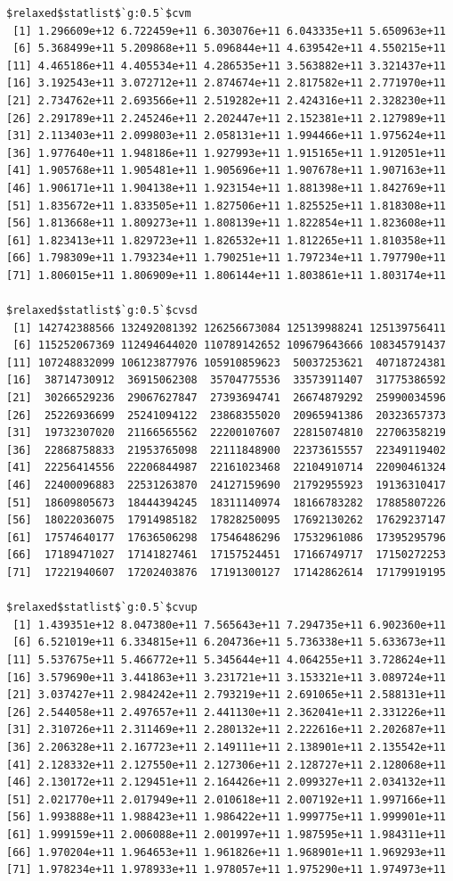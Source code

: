 \documentclass[
]{article}
\begin{document}
\begin{verbatim}
$relaxed$statlist$`g:0.5`$cvm
 [1] 1.296609e+12 6.722459e+11 6.303076e+11 6.043335e+11 5.650963e+11
 [6] 5.368499e+11 5.209868e+11 5.096844e+11 4.639542e+11 4.550215e+11
[11] 4.465186e+11 4.405534e+11 4.286535e+11 3.563882e+11 3.321437e+11
[16] 3.192543e+11 3.072712e+11 2.874674e+11 2.817582e+11 2.771970e+11
[21] 2.734762e+11 2.693566e+11 2.519282e+11 2.424316e+11 2.328230e+11
[26] 2.291789e+11 2.245246e+11 2.202447e+11 2.152381e+11 2.127989e+11
[31] 2.113403e+11 2.099803e+11 2.058131e+11 1.994466e+11 1.975624e+11
[36] 1.977640e+11 1.948186e+11 1.927993e+11 1.915165e+11 1.912051e+11
[41] 1.905768e+11 1.905481e+11 1.905696e+11 1.907678e+11 1.907163e+11
[46] 1.906171e+11 1.904138e+11 1.923154e+11 1.881398e+11 1.842769e+11
[51] 1.835672e+11 1.833505e+11 1.827506e+11 1.825525e+11 1.818308e+11
[56] 1.813668e+11 1.809273e+11 1.808139e+11 1.822854e+11 1.823608e+11
[61] 1.823413e+11 1.829723e+11 1.826532e+11 1.812265e+11 1.810358e+11
[66] 1.798309e+11 1.793234e+11 1.790251e+11 1.797234e+11 1.797790e+11
[71] 1.806015e+11 1.806909e+11 1.806144e+11 1.803861e+11 1.803174e+11

$relaxed$statlist$`g:0.5`$cvsd
 [1] 142742388566 132492081392 126256673084 125139988241 125139756411
 [6] 115252067369 112494644020 110789142652 109679643666 108345791437
[11] 107248832099 106123877976 105910859623  50037253621  40718724381
[16]  38714730912  36915062308  35704775536  33573911407  31775386592
[21]  30266529236  29067627847  27393694741  26674879292  25990034596
[26]  25226936699  25241094122  23868355020  20965941386  20323657373
[31]  19732307020  21166565562  22200107607  22815074810  22706358219
[36]  22868758833  21953765098  22111848900  22373615557  22349119402
[41]  22256414556  22206844987  22161023468  22104910714  22090461324
[46]  22400096883  22531263870  24127159690  21792955923  19136310417
[51]  18609805673  18444394245  18311140974  18166783282  17885807226
[56]  18022036075  17914985182  17828250095  17692130262  17629237147
[61]  17574640177  17636506298  17546486296  17532961086  17395295796
[66]  17189471027  17141827461  17157524451  17166749717  17150272253
[71]  17221940607  17202403876  17191300127  17142862614  17179919195

$relaxed$statlist$`g:0.5`$cvup
 [1] 1.439351e+12 8.047380e+11 7.565643e+11 7.294735e+11 6.902360e+11
 [6] 6.521019e+11 6.334815e+11 6.204736e+11 5.736338e+11 5.633673e+11
[11] 5.537675e+11 5.466772e+11 5.345644e+11 4.064255e+11 3.728624e+11
[16] 3.579690e+11 3.441863e+11 3.231721e+11 3.153321e+11 3.089724e+11
[21] 3.037427e+11 2.984242e+11 2.793219e+11 2.691065e+11 2.588131e+11
[26] 2.544058e+11 2.497657e+11 2.441130e+11 2.362041e+11 2.331226e+11
[31] 2.310726e+11 2.311469e+11 2.280132e+11 2.222616e+11 2.202687e+11
[36] 2.206328e+11 2.167723e+11 2.149111e+11 2.138901e+11 2.135542e+11
[41] 2.128332e+11 2.127550e+11 2.127306e+11 2.128727e+11 2.128068e+11
[46] 2.130172e+11 2.129451e+11 2.164426e+11 2.099327e+11 2.034132e+11
[51] 2.021770e+11 2.017949e+11 2.010618e+11 2.007192e+11 1.997166e+11
[56] 1.993888e+11 1.988423e+11 1.986422e+11 1.999775e+11 1.999901e+11
[61] 1.999159e+11 2.006088e+11 2.001997e+11 1.987595e+11 1.984311e+11
[66] 1.970204e+11 1.964653e+11 1.961826e+11 1.968901e+11 1.969293e+11
[71] 1.978234e+11 1.978933e+11 1.978057e+11 1.975290e+11 1.974973e+11


\end{verbatim}
\end{document}
